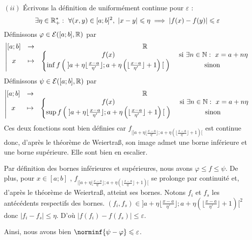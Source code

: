 \documentclass{article}
\begin{document}
\begin{question_kholle}
		$(ii)$ Écrivons la définition de uniformément continue pour $\varepsilon$ :
		\begin{equation*}
			\exists \eta \in \mathbb R_ +^* : \ \forall (x, y) \in [a;b]^2, \
			|x - y| \leqslant \eta \implies |f(x) - f(y)| \leqslant \varepsilon
		\end{equation*}
		Définissons $\varphi \in \mathcal{E}({[a;b]}, \mathbb R)$ par
		\begin{equation*}
			\left| \begin{matrix}
				[a;b] &\rightarrow& \mathbb R \\
				x &\mapsto& \left\{ \begin{matrix}
					f(x) &\text{ si } \exists n \in \mathbb N : \ x = a + n \eta \\
					\inf f\left( \; ]a + \eta \lfloor \frac{x-a}{\eta'} \rfloor; a + \eta \left( \lfloor \frac{x-a}{\eta'} \rfloor + 1 \right) [ \; \right) &\text{ sinon }
				\end{matrix} \right.
			\end{matrix} \right.
		\end{equation*}
		Définissons $\psi \in \mathcal{E}({[a;b]}, \mathbb R)$ par
		\begin{equation*}
			\left| \begin{matrix}
				[a;b] &\rightarrow& \mathbb R \\
				x &\mapsto& \left\{ \begin{matrix}
					f(x) &\text{ si } \exists n \in \mathbb N : \ x = a + n \eta \\
					\sup f\left( \; ] a + \eta \lfloor \frac{x-a}{\eta'} \rfloor; a + \eta \left( \lfloor \frac{x-a}{\eta'} \rfloor + 1\right)[ \; \right) &\text{ sinon }
				\end{matrix} \right.
			\end{matrix} \right.
		\end{equation*}
		Ces deux fonctions sont bien définies car $f_{|] a + \eta \lfloor \frac{x-a}{\eta'} \rfloor; a + \eta \left( \lfloor \frac{x-a}{\eta'} \rfloor + 1\right)[}$ est continue donc, d'après le théorème de Weiertraß, son image admet une borne inférieure et une borne supérieure.
		Elle sont bien en escalier.
		
		Par définition des bornes inférieures et supérieures, nous avons $\varphi \leqslant f \leqslant \psi$.
		De plus, pour $x \in [a;b]$ \fq, $f_{|] a + \eta \lfloor \frac{x-a}{\eta'} \rfloor; a + \eta \left( \lfloor \frac{x-a}{\eta'} \rfloor + 1\right)[}$ se prolonge par continuité et, d'après le théorème de Weiertraß, atteint ses bornes. Notons $f_i$ et $f_s$ les antécédents respectifs des bornes.
		$(f_i, f_s) \in ] a + \eta \lfloor \frac{x-a}{\eta'} \rfloor; a + \eta \left( \lfloor \frac{x-a}{\eta'} \rfloor + 1\right)[ ^2$ donc $\left|f_i - f_s\right| \leqslant \eta$.
		D'où $\left| f(f_i) - f(f_s) \right| \leqslant \varepsilon$.
		
		Ainsi, nous avons bien $\norminf{\psi - \varphi} \leqslant \varepsilon$.
	\end{question_kholle}
\end{document}

